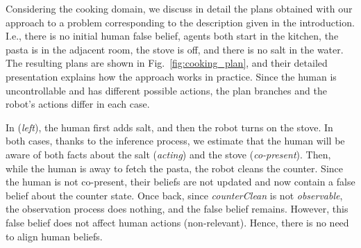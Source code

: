 Considering the cooking domain, we discuss in detail the plans obtained with our approach to a problem corresponding to the description given in the introduction. 
I.e., there is no initial human false belief, agents both start in the kitchen, the pasta is in the adjacent room, the stove is off, and there is no salt in the water. The resulting plans are shown in Fig.~\ref{fig:cooking_plan}, and their detailed presentation explains how the approach works in practice. 
Since the human is uncontrollable and has different possible actions, the plan branches and the robot's actions differ in each case. 

In (\textit{left}), the human first adds salt, and then the robot turns on the stove. In both cases, thanks to the inference process, we estimate that the human will be aware of both facts about the salt (\textit{acting}) and the stove (\textit{co-present}). Then, while the human is away to fetch the pasta, the robot cleans the counter. Since the human is not co-present, their beliefs are not updated and now contain a false belief about the counter state. Once back, since \textit{counterClean} is not \textit{observable}, the observation process does nothing, and the false belief remains. However, this false belief does not affect human actions (non-relevant). Hence, there is no need to align human beliefs.

